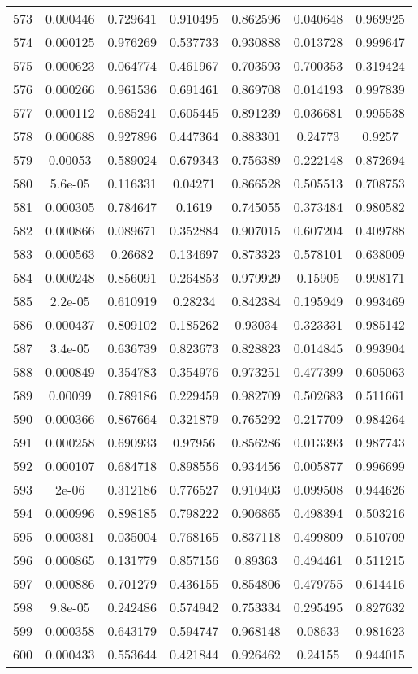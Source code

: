\begin{table}
\begin{tabular}{c|c|c|c|c|c|c}
573 & 0.000446 & 0.729641 & 0.910495 & 0.862596 & 0.040648 & 0.969925\\
574 & 0.000125 & 0.976269 & 0.537733 & 0.930888 & 0.013728 & 0.999647\\
575 & 0.000623 & 0.064774 & 0.461967 & 0.703593 & 0.700353 & 0.319424\\
576 & 0.000266 & 0.961536 & 0.691461 & 0.869708 & 0.014193 & 0.997839\\
577 & 0.000112 & 0.685241 & 0.605445 & 0.891239 & 0.036681 & 0.995538\\
578 & 0.000688 & 0.927896 & 0.447364 & 0.883301 & 0.24773 & 0.9257\\
579 & 0.00053 & 0.589024 & 0.679343 & 0.756389 & 0.222148 & 0.872694\\
580 & 5.6e-05 & 0.116331 & 0.04271 & 0.866528 & 0.505513 & 0.708753\\
581 & 0.000305 & 0.784647 & 0.1619 & 0.745055 & 0.373484 & 0.980582\\
582 & 0.000866 & 0.089671 & 0.352884 & 0.907015 & 0.607204 & 0.409788\\
583 & 0.000563 & 0.26682 & 0.134697 & 0.873323 & 0.578101 & 0.638009\\
584 & 0.000248 & 0.856091 & 0.264853 & 0.979929 & 0.15905 & 0.998171\\
585 & 2.2e-05 & 0.610919 & 0.28234 & 0.842384 & 0.195949 & 0.993469\\
586 & 0.000437 & 0.809102 & 0.185262 & 0.93034 & 0.323331 & 0.985142\\
587 & 3.4e-05 & 0.636739 & 0.823673 & 0.828823 & 0.014845 & 0.993904\\
588 & 0.000849 & 0.354783 & 0.354976 & 0.973251 & 0.477399 & 0.605063\\
589 & 0.00099 & 0.789186 & 0.229459 & 0.982709 & 0.502683 & 0.511661\\
590 & 0.000366 & 0.867664 & 0.321879 & 0.765292 & 0.217709 & 0.984264\\
591 & 0.000258 & 0.690933 & 0.97956 & 0.856286 & 0.013393 & 0.987743\\
592 & 0.000107 & 0.684718 & 0.898556 & 0.934456 & 0.005877 & 0.996699\\
593 & 2e-06 & 0.312186 & 0.776527 & 0.910403 & 0.099508 & 0.944626\\
594 & 0.000996 & 0.898185 & 0.798222 & 0.906865 & 0.498394 & 0.503216\\
595 & 0.000381 & 0.035004 & 0.768165 & 0.837118 & 0.499809 & 0.510709\\
596 & 0.000865 & 0.131779 & 0.857156 & 0.89363 & 0.494461 & 0.511215\\
597 & 0.000886 & 0.701279 & 0.436155 & 0.854806 & 0.479755 & 0.614416\\
598 & 9.8e-05 & 0.242486 & 0.574942 & 0.753334 & 0.295495 & 0.827632\\
599 & 0.000358 & 0.643179 & 0.594747 & 0.968148 & 0.08633 & 0.981623\\
600 & 0.000433 & 0.553644 & 0.421844 & 0.926462 & 0.24155 & 0.944015\\
\end{tabular}
\end{table}

